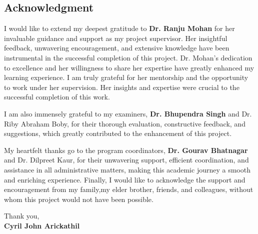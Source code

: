 
\begin{titlepage}
    \begin{flushright}
        
  
\section*{Acknowledgment}
\justifying
I would like to extend my deepest gratitude to \textbf{ Dr. Ranju Mohan} for her invaluable guidance
and support as my project supervisor. Her insightful feedback, unwavering encouragement, and
extensive knowledge have been instrumental in the successful completion of this project. Dr.
Mohan's dedication to excellence and her willingness to share her expertise have greatly
enhanced my learning experience. I am truly grateful for her mentorship and the opportunity
to work under her supervision. Her insights and expertise were crucial to the successful
completion of this work.

I am also immensely grateful to my examiners, \textbf{Dr. Bhupendra Singh} and Dr. Riby Abraham
Boby, for their thorough evaluation, constructive feedback, and suggestions, which greatly
contributed to the enhancement of this project.

My heartfelt thanks go to the program coordinators, \textbf{ Dr. Gourav Bhatnagar} and Dr. Dilpreet
Kaur, for their unwavering support, efficient coordination, and assistance in all administrative
matters, making this academic journey a smooth and enriching experience.
Finally, I would like to acknowledge the support and encouragement from my family,my elder brother, friends,
and colleagues, without whom this project would not have been possible.
\vspace*{3\baselineskip}


Thank you, \\

{\large  \bfseries Cyril John Arickathil }


\end{flushright}

\end{titlepage}
